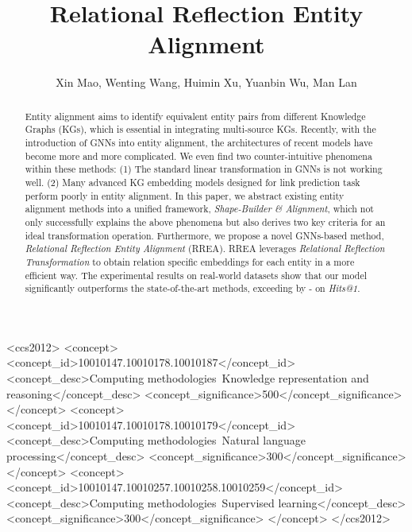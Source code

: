 \documentclass[sigconf,camera-ready]{acmart}
\begin{document}
\fancyhead{}
\title{Relational Reflection Entity Alignment}

\author{Xin Mao, Wenting Wang, Huimin Xu, Yuanbin Wu, Man Lan}





\begin{abstract}
Entity alignment aims to identify equivalent entity pairs from different Knowledge Graphs (KGs), which is essential in integrating multi-source KGs. 
Recently, with the introduction of GNNs into entity alignment, the architectures of recent models have become more and more complicated.
We even find two counter-intuitive phenomena within these methods:
(1) The standard linear transformation in GNNs is not working well.
(2) Many advanced KG embedding models designed for link prediction task perform poorly in entity alignment.
In this paper, we abstract existing entity alignment methods into a unified framework, \emph{Shape-Builder \& Alignment},
which not only successfully explains the above phenomena but also derives two key criteria for an ideal transformation operation.
Furthermore, we propose a novel GNNs-based method, \emph{Relational Reflection Entity Alignment} (RREA).
RREA leverages \emph{Relational Reflection Transformation} to obtain relation specific embeddings for each entity in a more efficient way.
The experimental results on real-world datasets show that our model significantly outperforms the state-of-the-art methods, exceeding by - on \emph{Hits@1}.
\end{abstract}

\begin{CCSXML}
<ccs2012>
<concept>
<concept_id>10010147.10010178.10010187</concept_id>
<concept_desc>Computing methodologies~Knowledge representation and reasoning</concept_desc>
<concept_significance>500</concept_significance>
</concept>
<concept>
<concept_id>10010147.10010178.10010179</concept_id>
<concept_desc>Computing methodologies~Natural language processing</concept_desc>
<concept_significance>300</concept_significance>
</concept>
<concept>
<concept_id>10010147.10010257.10010258.10010259</concept_id>
<concept_desc>Computing methodologies~Supervised learning</concept_desc>
<concept_significance>300</concept_significance>
</concept>
</ccs2012>
\end{CCSXML}

\end{document}
